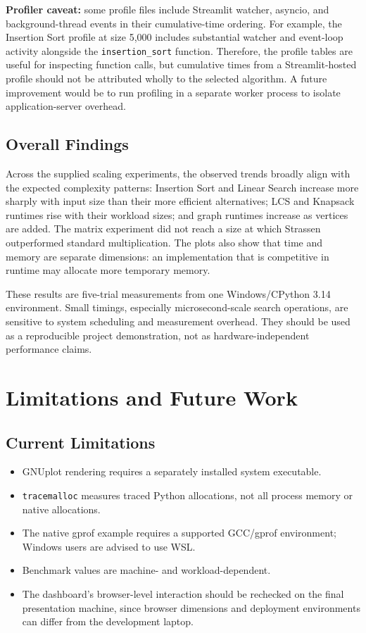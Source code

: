 \documentclass[11pt,a4paper]{report}
\begin{document}
\textbf{Profiler caveat:} some profile files include Streamlit watcher,
asyncio, and background-thread events in their cumulative-time ordering.
For example, the Insertion Sort profile at size 5,000 includes substantial
watcher and event-loop activity alongside the \texttt{insertion\_sort}
function. Therefore, the profile tables are useful for inspecting function
calls, but cumulative times from a Streamlit-hosted profile should not be
attributed wholly to the selected algorithm. A future improvement would be
to run profiling in a separate worker process to isolate application-server
overhead.

\section{Overall Findings}
Across the supplied scaling experiments, the observed trends broadly align
with the expected complexity patterns: Insertion Sort and Linear Search
increase more sharply with input size than their more efficient alternatives;
LCS and Knapsack runtimes rise with their workload sizes; and graph runtimes
increase as vertices are added. The matrix experiment did not reach a size at
which Strassen outperformed standard multiplication. The plots also show
that time and memory are separate dimensions: an implementation that is
competitive in runtime may allocate more temporary memory.

These results are five-trial measurements from one Windows/CPython 3.14
environment. Small timings, especially microsecond-scale search operations,
are sensitive to system scheduling and measurement overhead. They should be
used as a reproducible project demonstration, not as hardware-independent
performance claims.

\chapter{Limitations and Future Work}

\section{Current Limitations}
\begin{itemize}
    \item GNUplot rendering requires a separately installed system executable.
    \item \texttt{tracemalloc} measures traced Python allocations, not all
    process memory or native allocations.
    \item The native gprof example requires a supported GCC/gprof environment;
    Windows users are advised to use WSL.
    \item Benchmark values are machine- and workload-dependent.
    \item The dashboard's browser-level interaction should be rechecked on
    the final presentation machine, since browser dimensions and deployment
    environments can differ from the development laptop.
\end{itemize}
\end{document}
